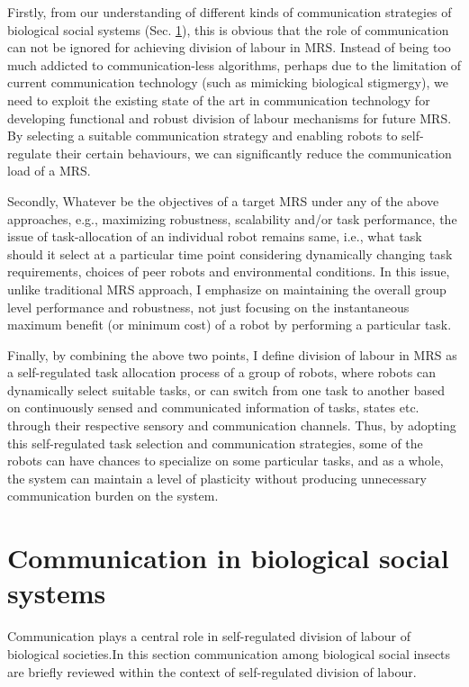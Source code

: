 Firstly, from our understanding of different kinds of communication strategies of biological social systems (Sec. \ref{bg:bio-comm}), this is obvious that the role of communication can not be ignored for achieving division of labour in MRS. Instead of being too much addicted to communication-less algorithms, perhaps due to the limitation of current communication  technology (such as mimicking biological stigmergy), we need to exploit the existing state of the art  in communication technology for developing functional and robust division of labour mechanisms for future MRS.  By selecting a suitable communication strategy and enabling robots to self-regulate their  certain behaviours,  we can significantly reduce the communication load of a MRS.

Secondly, Whatever be the objectives of a target MRS under any of the above approaches, e.g., maximizing robustness, scalability and/or task performance, the issue of task-allocation of an individual robot remains same, i.e., what task should it select at a particular time point considering dynamically changing task requirements, choices of peer robots and environmental conditions. In this issue, unlike traditional MRS approach, I emphasize on maintaining the overall group level performance and robustness, not just focusing on the instantaneous maximum benefit (or minimum cost) of a robot by performing a particular task.

Finally, by combining the above two points, I define division of labour in MRS as a self-regulated task allocation process of a group of robots, where  robots can dynamically select suitable tasks, or can switch from one task to another based on  continuously sensed  and communicated information of tasks, states etc. through their respective sensory and communication  channels. Thus, by adopting this self-regulated task selection and communication strategies, some of the robots can have chances to specialize on some particular tasks, and as a whole, the system can maintain a level of plasticity without producing unnecessary communication burden on the system.
\section{Communication in biological social systems}
\label{bg:bio-comm}
Communication plays a central role in self-regulated division of labour of biological societies.In this section communication among biological social insects are briefly reviewed within the context of self-regulated  division of labour.

